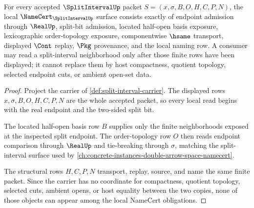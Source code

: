 \begin{theorem}
\label{thm:split-interval-namecert-obligations}
For every accepted $\SplitIntervalUp$ packet $S=(x,\sigma,B,O,H,C,P,N)$, the local $\NameCert_{\SplitIntervalUp}$ surface consists exactly of endpoint admission through $\RealUp$, split-bit admission, located half-open basis exposure, lexicographic order-topology exposure, componentwise $\hsame$ transport, displayed $\Cont$ replay, $\Pkg$ provenance, and the local naming row. A consumer may read a split-interval neighborhood only after those finite rows have been displayed; it cannot replace them by host compactness, quotient topology, selected endpoint cuts, or ambient open-set data.
\end{theorem}
\begin{proof}
Project the carrier of \autoref{def:split-interval-carrier}. The displayed rows $x,\sigma,B,O,H,C,P,N$ are the whole accepted packet, so every local read begins with the real endpoint and the two-sided split bit.

The located half-open basis row $B$ supplies only the finite neighborhoods exposed at the inspected split endpoint. The order-topology row $O$ then reads endpoint comparison through $\RealUp$ and tie-breaking through $\sigma$, matching the split-interval surface used by \autoref{ch:concrete-instances-double-arrow-space-namecert}.

The structural rows $H,C,P,N$ transport, replay, source, and name the same finite packet. Since the carrier has no coordinate for compactness, quotient topology, selected cuts, ambient opens, or host equality between the two copies, none of those objects can appear among the local NameCert obligations.
\end{proof}

